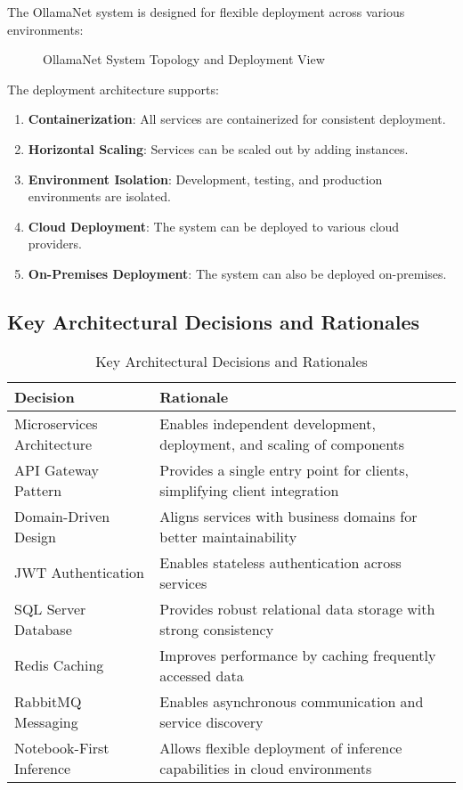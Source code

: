 The OllamaNet system is designed for flexible deployment across various environments:

\begin{figure}
    \centering
    \caption{OllamaNet System Topology and Deployment View}
    \label{fig:system-topology}
\end{figure}

The deployment architecture supports:

\begin{enumerate}
   \item \textbf{Containerization}: All services are containerized for consistent deployment.
   \item \textbf{Horizontal Scaling}: Services can be scaled out by adding instances.
   \item \textbf{Environment Isolation}: Development, testing, and production environments are isolated.
   \item \textbf{Cloud Deployment}: The system can be deployed to various cloud providers.
   \item \textbf{On-Premises Deployment}: The system can also be deployed on-premises.
\end{enumerate}

\subsection{Key Architectural Decisions and Rationales}

\begin{table}[h]
  \centering
  \caption{Key Architectural Decisions and Rationales}
  \label{tab:architectural-decisions}
  \begin{tabular}{|p{}|p{}|}
    \hline
    \textbf{Decision} & \textbf{Rationale} \\
    \hline
    Microservices Architecture & Enables independent development, deployment, and scaling of components \\
    \hline
    API Gateway Pattern & Provides a single entry point for clients, simplifying client integration \\
    \hline
    Domain-Driven Design & Aligns services with business domains for better maintainability \\
    \hline
    JWT Authentication & Enables stateless authentication across services \\
    \hline
    SQL Server Database & Provides robust relational data storage with strong consistency \\
    \hline
    Redis Caching & Improves performance by caching frequently accessed data \\
    \hline
    RabbitMQ Messaging & Enables asynchronous communication and service discovery \\
    \hline
    Notebook-First Inference & Allows flexible deployment of inference capabilities in cloud environments \\
    \hline
  \end{tabular}
\end{table}

